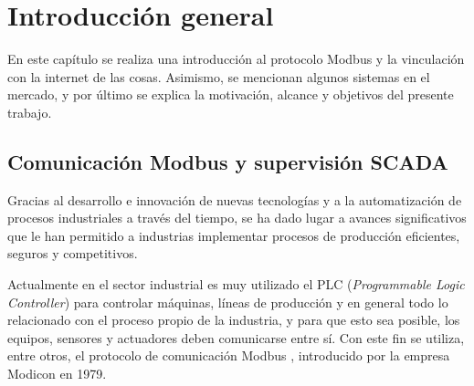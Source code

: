 
\chapter{Introducción general} %

\label{Chapter1} %
\label{IntroGeneral}


\newcommand{\keyword}[1]{\textbf{#1}}
\newcommand{\tabhead}[1]{\textbf{#1}}
\newcommand{\code}[1]{\texttt{#1}}
\newcommand{\file}[1]{\texttt{\bfseries#1}}
\newcommand{\option}[1]{\texttt{\itshape#1}}
\newcommand{\grados}{$^{\circ}$}

En este capítulo se realiza una introducción al protocolo Modbus y la vinculación con la internet de las cosas. Asimismo, se mencionan algunos sistemas en el mercado, y por último se explica la motivación, alcance y objetivos del presente trabajo.




\section{Comunicación Modbus y supervisión SCADA}

Gracias al desarrollo e innovación de nuevas tecnologías y a la automatización de procesos industriales a través del tiempo, se ha dado lugar a avances significativos que le han permitido a industrias implementar procesos de producción eficientes, seguros y competitivos.

Actualmente en el sector industrial es muy utilizado el PLC (\textit{Programmable Logic Controller}) \citep{WEBSITE:1} para controlar máquinas, líneas de producción y en general todo lo relacionado con el proceso propio de la industria, y para que esto sea posible, los equipos, sensores y actuadores deben comunicarse entre sí. Con este fin se utiliza, entre otros, el protocolo de comunicación Modbus  \citep{WEBSITE:2}, introducido por la empresa Modicon en 1979. 

